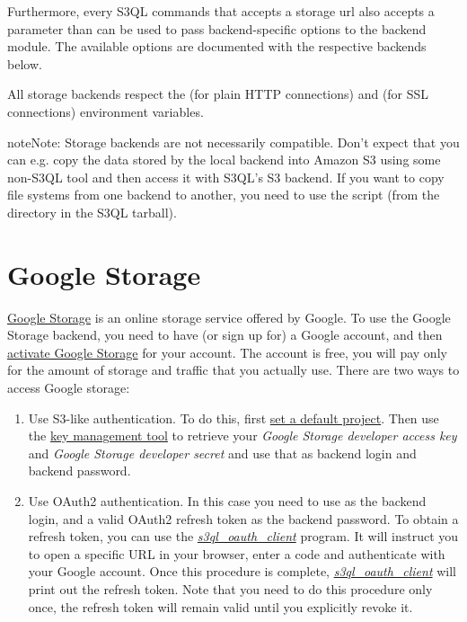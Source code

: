 \documentclass[letterpaper,10pt,english]{sphinxmanual}
\begin{document}
Furthermore, every S3QL commands that accepts a storage url also
accepts a  parameter than can be used to
pass backend-specific options to the backend module. The available
options are documented with the respective backends below.

All storage backends respect the  (for plain HTTP
connections) and  (for SSL connections)
environment variables.

\begin{notice}{note}{Note:}
Storage backends are not necessarily compatible. Don't expect that
you can e.g. copy the data stored by the local backend into Amazon
S3 using some non-S3QL tool and then access it with S3QL's S3
backend. If you want to copy file systems from one backend to
another, you need to use the  script (from the
 directory in the S3QL tarball).
\end{notice}


\section{Google Storage}
\label{backends:google-storage}
\href{http://code.google.com/apis/storage/}{Google Storage} is an online
storage service offered by Google. To use the Google Storage backend,
you need to have (or sign up for) a Google account, and then \href{http://code.google.com/apis/storage/docs/signup.html}{activate
Google Storage}
for your account. The account is free, you will pay only for the
amount of storage and traffic that you actually use. There are two
ways to access Google storage:
\begin{enumerate}
\item {} 
Use S3-like authentication. To do this, first \href{https://developers.google.com/storage/docs/migrating\#defaultproj}{set a  default
project}.
Then use the \href{https://code.google.com/apis/console/\#:storage:legacy}{key management tool} to
retrieve your \emph{Google Storage developer access key} and \emph{Google
Storage developer secret} and use that as backend login and backend
password.

\item {} 
Use OAuth2 authentication. In this case you need to use 
as the backend login, and a valid OAuth2 refresh token as the
backend password. To obtain a refresh token, you can use the
{\hyperref[man/oauth_client:oauth-client]{\emph{s3ql\_oauth\_client}}} program. It will instruct
you to open a specific URL in your browser, enter a code and
authenticate with your Google account. Once this procedure is
complete, {\hyperref[man/oauth_client:oauth-client]{\emph{s3ql\_oauth\_client}}} will print out
the refresh token. Note that you need to do this procedure only
once, the refresh token will remain valid until you explicitly
revoke it.

\end{enumerate}
\end{document}

